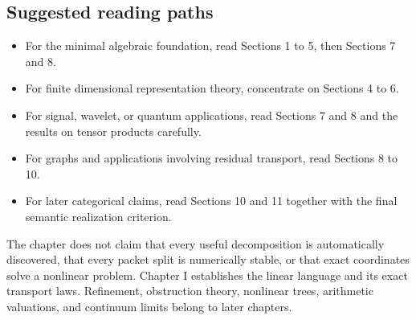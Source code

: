 \subsection*{Suggested reading paths}
\begin{itemize}
\item For the minimal algebraic foundation, read Sections 1 to 5, then Sections 7 and 8.
\item For finite dimensional representation theory, concentrate on Sections 4 to 6.
\item For signal, wavelet, or quantum applications, read Sections 7 and 8 and the results on tensor products carefully.
\item For graphs and applications involving residual transport, read Sections 8 to 10.
\item For later categorical claims, read Sections 10 and 11 together with the final semantic realization criterion.
\end{itemize}

\begin{warningbox}
The chapter does not claim that every useful decomposition is automatically discovered, that every packet split is numerically stable, or that exact coordinates solve a nonlinear problem.  Chapter I establishes the linear language and its exact transport laws.  Refinement, obstruction theory, nonlinear trees, arithmetic valuations, and continuum limits belong to later chapters.
\end{warningbox}

